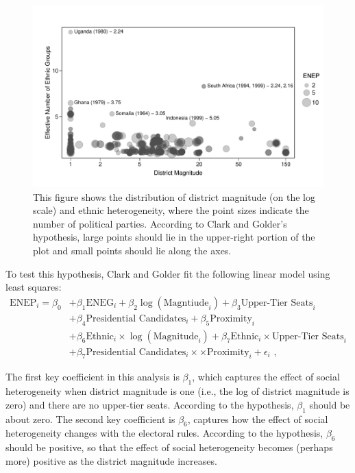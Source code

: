 \documentclass[12pt]{article}
\begin{document}
\begin{figure}[h!]
\begin{center}
\includegraphics[scale = 0.8]{figs/cg-scatter.pdf}
\caption{This figure shows the distribution of district magnitude (on the log scale) and ethnic heterogeneity, where the point sizes indicate the number of political parties. 
According to Clark and Golder's hypothesis, large points should lie in the upper-right portion of the plot and small points should lie along the axes.}\label{fig:cg-scatter}
\end{center}
\end{figure}

To test this hypothesis, Clark and Golder fit the following linear model using least squares:
\begin{align*}
\text{ENEP}_i = \beta_0 &+ \beta_1 \text{ENEG}_i + \beta_2 \log(\text{Magntiude}_i) + \beta_3 \text{Upper-Tier Seats}_i\\
                                                     &+\beta_4 \text{Presidential Candidates}_i + \beta_5 \text{Proximity}_i\\
                                                     &+ \beta_6 \text{Ethnic}_i \times \log (\text{Magnitude}_i) + \beta_7 \text{Ethnic}_i \times \text{Upper-Tier Seats}_i\\
                                                     &+ \beta_7 \text{Presidential Candidates}_i \times \times \text{Proximity}_i + \epsilon_i\text{ ,}
\end{align*}

The first key coefficient in this analysis is $\beta_1$, which captures the effect of social heterogeneity when district magnitude is one (i.e., the log of district magnitude is zero) and there are no upper-tier seats. 
According to the hypothesis, $\beta_1$ should be about zero. The second key coefficient is $\beta_6$, captures how the effect of social heterogeneity changes with the electoral rules. 
According to the hypothesis, $\beta_6$ should be positive, so that the effect of social heterogeneity becomes (perhaps more) positive as the district magnitude increases.
\end{document}
